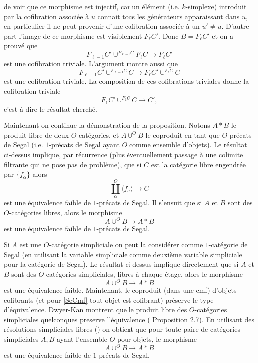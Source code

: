 \documentclass[12pt]{article}
\begin{document}
de voir
que ce morphisme est injectif, car un \'el\'ement (i.e. $k$-simplexe)
introduit
par la cofibration associ\'ee \`a $u$ connait tous les g\'en\'erateurs
apparaissant
dans $u$, en particulier il ne peut provenir d'une
cofibration associ\'ee \`a un $u'\neq u$. D'autre part l'image de ce
morphisme est
visiblement $F_{\ell} C'$. Donc $B=F_{\ell} C'$ et on a prouv\'e que
$$
F_{\ell -1} C'\cup ^{F_{\ell -1}C} F_{\ell}C\rightarrow
F_{\ell} C'
$$
est une cofibration triviale. L'argument montre aussi que
$$
F_{\ell -1} C'\cup ^{F_{\ell -1}C} C\rightarrow
F_{\ell } C'\cup ^{F_{\ell }C} C
$$
est une cofibration triviale. La composition de ces
cofibrations triviales donne la cofibration triviale
$$
F_1C'\cup ^{F_1C} C\rightarrow C',
$$
c'est-\`a-dire le r\'esultat cherch\'e.


Maintenant on continue la d\'emonstration de la proposition. Notons
$A\ast B$ le produit libre de deux $O$-cat\'egories, et $A\cup ^OB$ le
coproduit en tant que $O$-pr\'ecats de Segal (i.e. $1$-pr\'ecats de Segal
ayant $O$
comme ensemble d'objets). Le r\'esultat ci-dessus implique, par
r\'ecurrence (plus
\'eventuellement passage \`a une colimite filtrante qui ne pose pas de
probl\`eme), que si $C$ est la cat\'egorie libre engendr\'ee par $\{
f_{\alpha}\}$
alors
$$
\coprod _{\alpha}^{O} \langle f_{\alpha} \rangle \rightarrow C
$$
est une \'equivalence faible de $1$-pr\'ecats de Segal. Il s'ensuit que si
$A$ et
$B$ sont des $O$-cat\'egories libres, alors le morphisme
$$
A\cup ^OB\rightarrow A\ast B
$$
est une \'equivalence faible de $1$-pr\'ecats de Segal.

Si $A$ est une $O$-cat\'egorie simpliciale on peut la consid\'erer comme
$1$-cat\'egorie de Segal (en utilisant la variable simpliciale comme deuxi\`eme
variable simpliciale pour la cat\'egorie de Segal). Le r\'esultat ci-dessus
implique directement que si $A$ et $B$ sont des $O$-cat\'egories simpliciales,
libres \`a chaque \'etage, alors le morphisme
$$
A\cup ^OB\rightarrow A\ast B
$$
est une \'equivalence faible. Maintenant, le coproduit (dans une cmf) d'objets
cofibrants (et pour \ref{SeCmf} tout objet est cofibrant) pr\'eserve le type
d'\'equivalence. Dwyer-Kan montrent que le produit libre des
$O$-cat\'egories simpliciales
quelconques preserve l'\'equivalence
(\cite{DwyerKan1} Proposition 2.7). En utilisant des r\'esolutions simpliciales
libres (\cite{DwyerKan1}) on obtient que pour toute paire de cat\'egories
simpliciales $A,B$ ayant l'ensemble $O$ pour objets,
le morphisme
$$
A\cup ^OB\rightarrow A\ast B
$$
est une \'equivalence faible de $1$-pr\'ecats de Segal.
\end{document}
